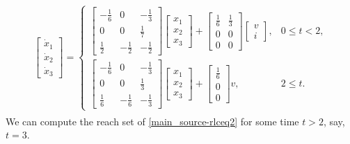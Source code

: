 \documentclass[letterpaper,10pt,english]{sphinxmanual}
\begin{document}
\label{main_source:equation-rlceq2}\begin{gather}
\begin{split}\left[\begin{array}{c}
\dot{x}_1\\
\dot{x}_2\\
\dot{x}_3\end{array}\right] = \left\{\begin{array}{ll}
\left[\begin{array}{ccc}
-\frac{1}{6} & 0 & -\frac{1}{3}\\
0 & 0 & \frac{1}{7}\\
\frac{1}{2} & -\frac{1}{2} & -\frac{1}{2}\end{array}\right]
\left[\begin{array}{c}
x_1\\
x_2\\
x_3\end{array}\right] + \left[\begin{array}{cc}
\frac{1}{6} & \frac{1}{3}\\
0 & 0\\
0 & 0\end{array}\right]\left[\begin{array}{c}
v\\
i\end{array}\right], & 0\leqslant t< 2, \\
\left[\begin{array}{ccc}
-\frac{1}{6} & 0 & -\frac{1}{3}\\
0 & 0 & \frac{1}{3}\\
\frac{1}{6} & -\frac{1}{6} & -\frac{1}{3}\end{array}\right]
\left[\begin{array}{c}
x_1\\
x_2\\
x_3\end{array}\right] + \left[\begin{array}{c}
\frac{1}{6} \\
0 \\
0 \end{array}\right]v, & 2\leqslant t. \end{array}\right.\end{split}\label{main_source-rlceq2}
\end{gather}
We can compute the reach set of \eqref{main_source-rlceq2} for some time $t>2$,
say, $t=3$.
\end{document}
